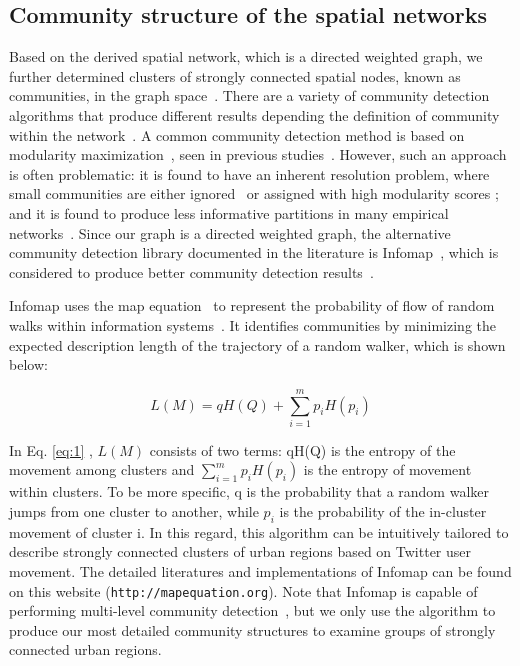 \documentclass[]{tGIS2e}
\begin{document}
{\subsection{Community structure of the spatial networks}
Based on the derived spatial network, which is a directed weighted graph, we further determined clusters of strongly connected spatial nodes, known as communities, in the graph space~\citep{coscia2011}. 
There are a variety of community detection algorithms that produce different results depending the definition of community within the network~\citep{coscia2011}.
A common community detection method is based on modularity maximization~\citep{newman2006}, seen in previous studies~\citep{hawelka,ratti2010,song2012}.
However, such an approach is often problematic: it is found to have an inherent resolution problem, where small communities are either ignored~\citep{fortunato2007} or assigned with high modularity scores \citep{guimera2004}; and it is found to produce less informative partitions in many empirical networks~\citep{good2010}.
Since our graph is a directed weighted graph, the alternative community detection library documented in the literature is Infomap~\citep{domenico2015,rosvall2008}, which is considered to produce better community detection results~\citep{lancichinetti2009}.

Infomap uses the map equation~\citep{rosvall2010} to represent the probability of flow of random walks within information systems~\citep{rosvall2008}.
It identifies communities by minimizing the expected description length of the trajectory of a random walker, which is shown below:

\begin{equation} \label{eq:1}
L(M)=qH(Q) + \sum_{i=1}^{m} p_{i}H(p_{i})
\end{equation}

In Eq. \eqref{eq:1} , $L(M)$ consists of two terms: qH(Q) is the entropy of the movement among clusters and $ \sum_{i=1}^{m} p_{i}H(p_{i})$ is the entropy of movement within clusters. 
To be more specific, q is the probability that a random walker jumps from one cluster to another, while $p_i$ is the probability of the in-cluster movement of cluster i.
In this regard, this algorithm can be intuitively tailored to describe strongly connected clusters of urban regions based on Twitter user movement.
The detailed literatures and implementations of Infomap can be found on this website ({\tt{http://mapequation.org}}).
Note that Infomap is capable of performing multi-level community detection~\cite{domenico2015}, but we only use the algorithm to produce our most detailed community structures
to examine groups of strongly connected urban regions.

}
\end{document}
